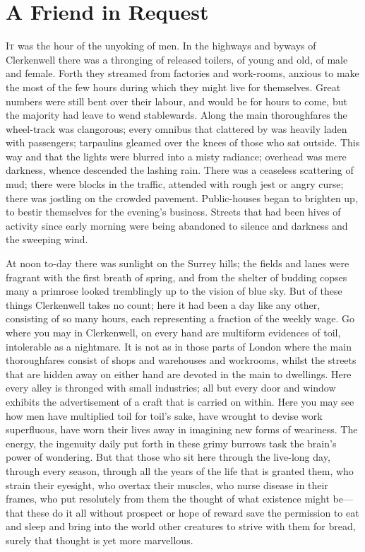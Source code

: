 \chapter{A Friend in Request}

\textsc{It} was the hour of the unyoking of men. In the highways and
byways of Clerkenwell there was a thronging of released toilers, of
young and old, of male and female. Forth they streamed from factories
and work-rooms, anxious to make the most of the few hours during which
they might live for themselves. Great numbers were still bent over their
labour, and would be for hours to come, but the majority had leave to
wend stablewards. Along the main thoroughfares the wheel-track was
clangorous; every omnibus that clattered by was heavily laden with
passengers; tarpaulins gleamed over the knees of those who sat outside.
This way and that the lights were blurred into a misty radiance;
overhead was mere {\protect\hypertarget{24}{}{}}darkness, whence
descended the lashing rain. There was a ceaseless scattering of mud;
there were blocks in the traffic, attended with rough jest or angry
curse; there was jostling on the crowded pavement. Public-houses began
to brighten up, to bestir themselves for the evening's business. Streets
that had been hives of activity since early morning were being abandoned
to silence and darkness and the sweeping wind.

At noon to-day there was sunlight on the Surrey hills; the fields and
lanes were fragrant with the first breath of spring, and from the
shelter of budding copses many a primrose looked tremblingly up to the
vision of blue sky. But of these things Clerkenwell takes no count; here
it had been a day like any other, consisting of so many hours, each
representing a fraction of the weekly wage. Go where you may in
Clerkenwell, on every hand are multiform evidences of toil, intolerable
as a nightmare. It is not as in those parts of London where the main
thoroughfares consist of shops and warehouses and
{\protect\hypertarget{25}{}{}}workrooms, whilst the streets that are
hidden away on either hand are devoted in the main to dwellings. Here
every alley is thronged with small industries; all but every door and
window exhibits the advertisement of a craft that is carried on within.
Here you may see how men have multiplied toil for toil's sake, have
wrought to devise work superfluous, have worn their lives away in
imagining new forms of weariness. The energy, the ingenuity daily put
forth in these grimy burrows task the brain's power of wondering. But
that those who sit here through the live-long day, through every season,
through all the years of the life that is granted them, who strain their
eyesight, who overtax their muscles, who nurse disease in their frames,
who put resolutely from them the thought of what existence might
be---that these do it all without prospect or hope of reward save the
permission to eat and sleep and bring into the world other creatures to
strive with them for bread, surely that thought is yet more marvellous.

